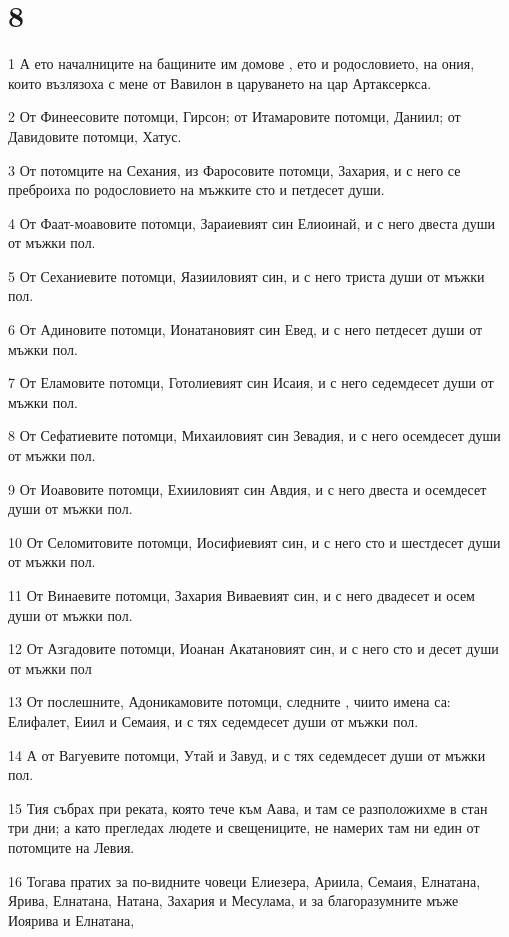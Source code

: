 \chapter{8}

\par 1 А ето началниците на бащините им домове , ето и родословието, на ония, които възлязоха с мене от Вавилон в царуването на цар Артаксеркса.
\par 2 От Финеесовите потомци, Гирсон; от Итамаровите потомци, Даниил; от Давидовите потомци, Хатус.
\par 3 От потомците на Сехания, из Фаросовите потомци, Захария, и с него се преброиха по родословието на мъжките сто и петдесет души.
\par 4 От Фаат-моавовите потомци, Зараиевият син Елиоинай, и с него двеста души от мъжки пол.
\par 5 От Сеханиевите потомци, Яазииловият син, и с него триста души от мъжки пол.
\par 6 От Адиновите потомци, Ионатановият син Евед, и с него петдесет души от мъжки пол.
\par 7 От Еламовите потомци, Готолиевият син Исаия, и с него седемдесет души от мъжки пол.
\par 8 От Сефатиевите потомци, Михаиловият син Зевадия, и с него осемдесет души от мъжки пол.
\par 9 От Иоавовите потомци, Ехииловият син Авдия, и с него двеста и осемдесет души от мъжки пол.
\par 10 От Селомитовите потомци, Иосифиевият син, и с него сто и шестдесет души от мъжки пол.
\par 11 От Винаевите потомци, Захария Виваевият син, и с него двадесет и осем души от мъжки пол.
\par 12 От Азгадовите потомци, Иоанан Акатановият син, и с него сто и десет души от мъжки пол
\par 13 От послешните, Адоникамовите потомци, следните , чиито имена са: Елифалет, Еиил и Семаия, и с тях седемдесет души от мъжки пол.
\par 14 А от Вагуевите потомци, Утай и Завуд, и с тях седемдесет души от мъжки пол.
\par 15 Тия събрах при реката, която тече към Аава, и там се разположихме в стан три дни; а като прегледах людете и свещениците, не намерих там ни един от потомците на Левия.
\par 16 Тогава пратих за по-видните човеци Елиезера, Ариила, Семаия, Елнатана, Ярива, Елнатана, Натана, Захария и Месулама, и за благоразумните мъже Иоярива и Елнатана,
